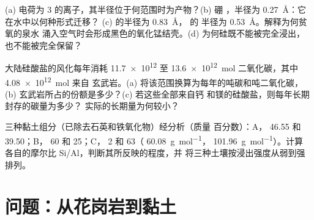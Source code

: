 \begin{exercise}[$\star\star\star$]\label{exo:b1:weathering-clays:10}
(a) 电荷为 3 的离子，其半径位于何范围时为产物？(b) 硼
，半径为 \qty{0.27}{\angstrom}：它在水中以何种形式迁移？
(c)  的半径为 \qty{0.83}{\angstrom}， 的
半径为 \qty{0.53}{\angstrom}。解释为何贫氧的泉水
涌入空气时会形成黑色的氧化锰结壳。(d) 为何硅既不能被完全浸出，
也不能被完全保留？
\end{exercise}

\begin{exercise}[$\star\star\star$]\label{exo:b1:weathering-clays:11}
大陆硅酸盐的风化每年消耗 \num{11.7e12} 至
\qty{13.6e12}{mol} 二氧化碳，其中 \qty{4.08e12}{mol} 来自
玄武岩。(a) 将该范围换算为每年的吨碳和吨二氧化碳，
(b) 玄武岩所占的份额是多少？(c) 若这些全部来自钙
和镁的硅酸盐，则每年长期封存的碳量为多少？
实际的长期量为何较小？
\end{exercise}

\begin{exercise}[$\star\star\star$]\label{exo:b1:weathering-clays:12}
三种黏土组分（已除去石英和铁氧化物）经分析（质量
百分数）：A， \num{46.55} 和  \num{39.50}；B， 60 和
 25；C， 2 和  63（
\qty{60.08}{g.mol^{-1}}， \qty{101.96}{g.mol^{-1}}）。计算
各自的摩尔比 Si/Al，判断其所反映的程度，并
将三种土壤按浸出强度从弱到强排列。
\end{exercise}

\section{问题：从花岗岩到黏土}

